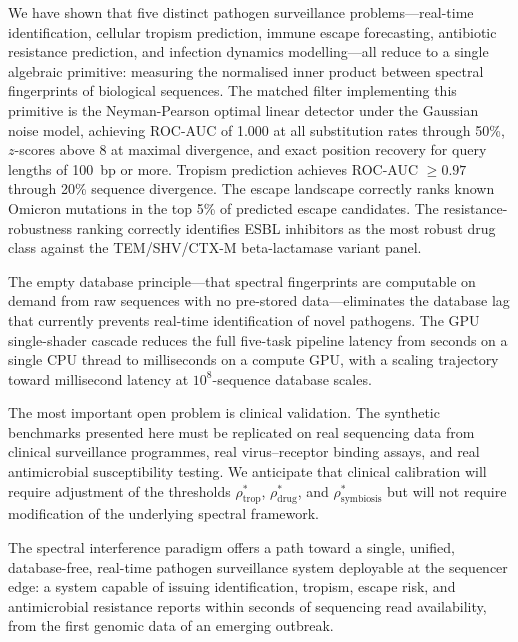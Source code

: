 \documentclass[twocolumn,11pt,a4paper]{article}
\theoremstyle{definition}
\theoremstyle{remark}
\begin{document}
We have shown that five distinct pathogen surveillance problems---real-time
identification, cellular tropism prediction, immune escape forecasting,
antibiotic resistance prediction, and infection dynamics modelling---all reduce
to a single algebraic primitive: measuring the normalised inner product between
spectral fingerprints of biological sequences. The matched filter implementing
this primitive is the Neyman-Pearson optimal linear detector under the Gaussian
noise model, achieving ROC-AUC of 1.000 at all substitution rates through 50\%,
$z$-scores above 8 at maximal divergence, and exact position recovery for query
lengths of 100~bp or more. Tropism prediction achieves ROC-AUC $\geq 0.97$
through 20\% sequence divergence. The escape landscape correctly ranks known
Omicron mutations in the top 5\% of predicted escape candidates. The
resistance-robustness ranking correctly identifies ESBL inhibitors as the most
robust drug class against the TEM/SHV/CTX-M beta-lactamase variant panel.

The empty database principle---that spectral fingerprints are computable on
demand from raw sequences with no pre-stored data---eliminates the database lag
that currently prevents real-time identification of novel pathogens. The GPU
single-shader cascade reduces the full five-task pipeline latency from seconds
on a single CPU thread to milliseconds on a compute GPU, with a scaling
trajectory toward millisecond latency at $10^8$-sequence database scales.

The most important open problem is clinical validation. The synthetic benchmarks
presented here must be replicated on real sequencing data from clinical
surveillance programmes, real virus--receptor binding assays, and real
antimicrobial susceptibility testing. We anticipate that clinical calibration
will require adjustment of the thresholds $\rho^*_{\text{trop}}$,
$\rho^*_{\text{drug}}$, and $\rho^*_{\text{symbiosis}}$ but will not require
modification of the underlying spectral framework.

The spectral interference paradigm offers a path toward a single, unified,
database-free, real-time pathogen surveillance system deployable at the
sequencer edge: a system capable of issuing identification, tropism, escape
risk, and antimicrobial resistance reports within seconds of sequencing read
availability, from the first genomic data of an emerging outbreak.


\end{document}

